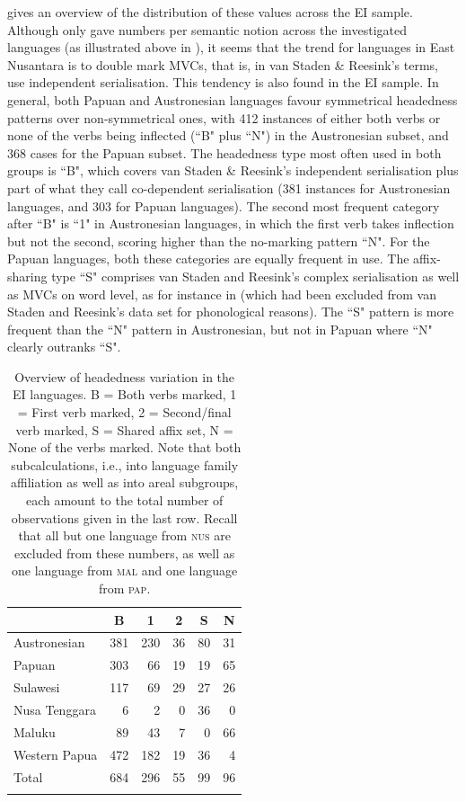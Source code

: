  gives an overview of the distribution of these values across the EI sample. Although \citet{vanstaden2008serial} only gave numbers per semantic notion across the investigated languages (as illustrated above in ), it seems that the trend for languages in East Nusantara is to double mark MVCs, that is, in van Staden \& Reesink's terms, use independent serialisation. This tendency is also found in the EI sample. In general, both Papuan and Austronesian languages favour symmetrical headedness patterns over non-symmetrical ones, with 412 instances of either both verbs or none of the verbs being inflected (``B" plus ``N") in the Austronesian subset, and 368 cases for the Papuan subset. The headedness type most often used in both groups is ``B", which covers van Staden \& Reesink's independent serialisation plus part of what they call co-dependent serialisation (381 instances for Austronesian languages, and 303 for Papuan languages). The second most frequent category after ``B" is ``1" in Austronesian languages, in which the first verb takes inflection but not the second, scoring higher than the no-marking pattern ``N". For the Papuan languages, both these categories are equally frequent in use. The affix-sharing type ``S" comprises van Staden and Reesink's complex serialisation as well as MVCs on word level, as for instance in  (which had been excluded from van Staden and Reesink's data set for phonological reasons). The ``S" pattern is more frequent than the ``N" pattern in Austronesian, but not in Papuan where ``N" clearly outranks ``S".

\begin{table}
\begin{tabular}{lrrrrr}
  \lsptoprule
& \multicolumn{1}{c}{B} & \multicolumn{1}{c}{1} & \multicolumn{1}{c}{2} & \multicolumn{1}{c}{S} & \multicolumn{1}{c}{N} \tabularnewline 
  \midrule
  Austronesian & 381 & 230 &  36 &  80 & 31 \tabularnewline
  Papuan & 303 & 66 &  19 &  19 & 65 \tabularnewline
   \midrule
  Sulawesi & 117 &  69 &  29 &  27 &  26 \tabularnewline
  Nusa Tenggara & 6 & 2 &  0 &  36 & 0 \tabularnewline
  Maluku & 89 &  43 &   7 &   0 &   66 \tabularnewline 
  Western Papua & 472 & 182 &  19 &  36 &  4 \tabularnewline 
\midrule
Total & 684 & 296 & 55 & 99 & 96 \tabularnewline
\lspbottomrule
\end{tabular}
\caption[Headedness variation in the EI sample]{Overview of headedness variation in the EI languages. B = Both verbs marked, 1 = First verb marked, 2 = Second/final verb marked, S = Shared affix set, N = None of the verbs marked. Note that both subcalculations, i.e., into language family affiliation as well as into areal subgroups, each amount to the total number of observations given in the last row. Recall that all but one language from \textsc{nus} are excluded from these numbers, as well as one language from \textsc{mal} and one language from \textsc{pap}.}
\label{table:Headedness_overview}
\end{table}

